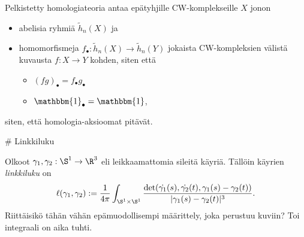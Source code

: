 \begin{maaritelma}
    Pelkistetty homologiateoria antaa epätyhjille CW-komplekseille $X$ jonon
    \begin{itemize}
        \item abelisia ryhmiä $\tilde h_n(X)$ ja
        \item homomorfismeja $f_\bullet:\tilde h_n(X)\to\tilde h_n(Y)$ jokaista CW-kompleksien välistä kuvausta $f:X\to Y$ kohden, siten että
        \begin{itemize}
            \item $(fg)_\bullet=f_\bullet g_\bullet$
            \item $\mathbbm{1}_\bullet=\mathbbm{1}$,
        \end{itemize}
    \end{itemize}
    siten, että homologia-aksioomat pitävät.
\end{maaritelma}

# Linkkiluku
\begin{maaritelma}
    Olkoot $\gamma_1,\gamma_2:\S^1\to\R^3$ eli leikkaamattomia sileitä käyriä. Tällöin käyrien \emph{linkkiluku} on
    \begin{equation*}
        \ell(\gamma_1,\gamma_2):=\frac{1}{4\pi}\int_{\S^1\times\S^1}\frac{\det(\dot{\gamma_1}(s),\dot{\gamma_2}(t),\gamma_1(s)-\gamma_2(t))}{|\gamma_1(s)-\gamma_2(t)|^3}.
    \end{equation*}
    Riittäisikö tähän vähän epämuodollisempi määrittely, joka perustuu kuviin? Toi integraali on aika tuhti.
\end{maaritelma}